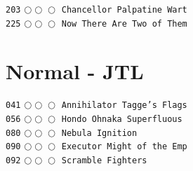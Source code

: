 \documentclass[a4paper,landscape]{article}
\begin{document}
\begin{multicols*}{5}
\texttt{203} \(\bigcirc\!\bigcirc\!\bigcirc\)  \texttt{Chancellor Palpatine Wart} \vspace{-0.3mm}\\ 
\texttt{225} \(\bigcirc\!\bigcirc\!\bigcirc\)  \texttt{Now There Are Two of Them} \vspace{-0.3mm}\\ 
\section{Normal - JTL} 
\vspace{-2mm} 
\texttt{041} \(\bigcirc\!\bigcirc\!\bigcirc\)  \texttt{Annihilator Tagge's Flags} \vspace{-0.3mm}\\ 
\texttt{056} \(\bigcirc\!\bigcirc\!\bigcirc\)  \texttt{Hondo Ohnaka Superfluous } \vspace{-0.3mm}\\ 
\texttt{080} \(\bigcirc\!\bigcirc\!\bigcirc\)  \texttt{Nebula Ignition} \vspace{-0.3mm}\\ 
\texttt{090} \(\bigcirc\!\bigcirc\!\bigcirc\)  \texttt{Executor Might of the Emp} \vspace{-0.3mm}\\ 
\texttt{092} \(\bigcirc\!\bigcirc\!\bigcirc\)  \texttt{Scramble Fighters} \vspace{-0.3mm}\\ 

\end{multicols*}
\end{document}
